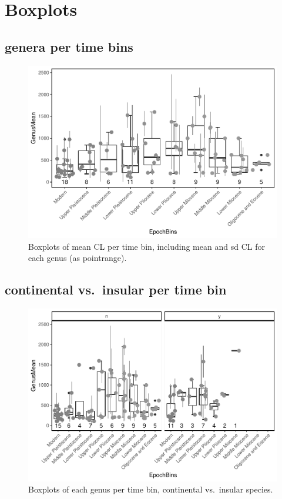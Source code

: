 \documentclass[]{article}
\begin{document}
\newpage

\section{Boxplots}\label{boxplots}

\subsection{genera per time bins}\label{genera-per-time-bins}

\begin{figure}[htbp]
\centering
\includegraphics{MA_JJ_files/figure-latex/Boxplots of each genus per time bin-1.pdf}
\caption{Boxplots of mean CL per time bin, including mean and sd CL for
each genus (as pointrange).}
\end{figure}

\newpage

\subsection{continental vs.~insular per time
bin}\label{continental-vs.insular-per-time-bin}

\begin{figure}[htbp]
\centering
\includegraphics{MA_JJ_files/figure-latex/Boxplots of each genus per time bin, continental vs. insular-1.pdf}
\caption{Boxplots of each genus per time bin, continental vs.~insular
species.}
\end{figure}
\end{document}
